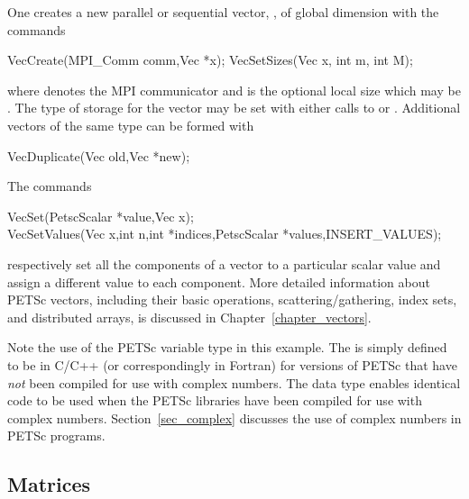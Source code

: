 One creates a new parallel or 
sequential vector, , of global dimension  with the 
commands    
\begin{tabbing}
  VecCreate(MPI\_Comm comm,Vec *x);
  VecSetSizes(Vec x, int m, int M);
\end{tabbing}
where  denotes the MPI communicator and  is the optional local size
which may be . The type of storage
for the vector may be set with either calls to 
 or .  
Additional vectors of the same type can be formed with
\begin{tabbing}
  VecDuplicate(Vec old,Vec *new);
\end{tabbing}
The commands  
\begin{tabbing}
  VecSet(PetscScalar *value,Vec x);\\
  VecSetValues(Vec x,int n,int *indices,PetscScalar *values,INSERT\_VALUES);
\end{tabbing}
respectively set all the components of a vector to a particular scalar
value and assign a different value to each component.  More
detailed information about PETSc vectors, including their basic
operations, scattering/gathering, index sets, and distributed arrays, is
discussed in Chapter~\ref{chapter_vectors}.

 
Note the use of the PETSc variable type  in this example.
The  is simply defined to be  in C/C++
(or correspondingly   in Fortran) for versions of
PETSc that have {\em not} been compiled for use with complex numbers.
The  data type enables
identical code to be used when the PETSc libraries have been compiled
for use with complex numbers.  Section~\ref{sec_complex} discusses the
use of complex numbers in PETSc programs.

\subsection*{Matrices}
\label{sec_matintro}

